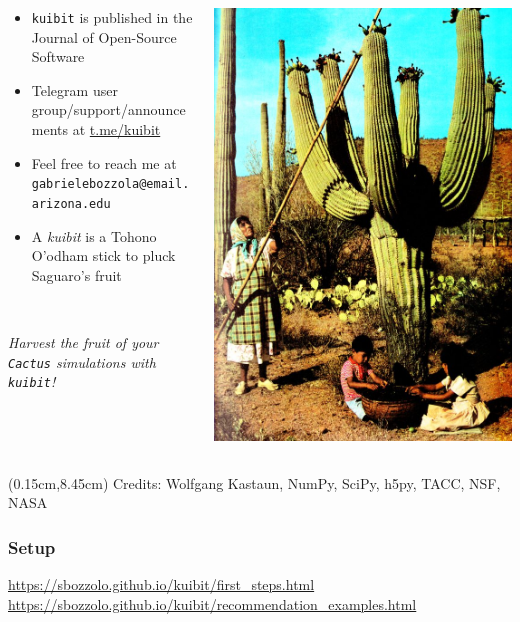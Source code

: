\documentclass[compress, aspectratio=169]{beamer}
\begin{document}
\begin{frame}
  \centering
  \begin{columns}
    \begin{column}{0.6\linewidth}
      \begin{itemize}
        \item \texttt{kuibit} is published in the Journal of Open-Source Software
        \item Telegram user group/support/announcements at \url{t.me/kuibit}
        \item Feel free to reach me at \texttt{gabrielebozzola@email.arizona.edu}
        \item A \emph{kuibit} is a Tohono O'odham stick to pluck Saguaro's fruit
      \end{itemize}
      \hfill \\[0.5cm]
      \begin{center}
      \emph{Harvest the fruit of your \texttt{Cactus} simulations with \texttt{kuibit}!}
    \end{center}
    \end{column}
    \begin{column}{0.4\linewidth}
      \includegraphics[width=0.85\linewidth]{kuibit}
    \end{column}
  \end{columns}
  \begin{textblock*}{11.5cm}(0.15cm,8.45cm) %
    Credits: Wolfgang Kastaun, NumPy, SciPy, h5py, TACC, NSF, NASA
  \end{textblock*}
\end{frame}

\begin{frame}
  \frametitle{Setup}
  \centering
  \url{https://sbozzolo.github.io/kuibit/first_steps.html}
  \url{https://sbozzolo.github.io/kuibit/recommendation_examples.html}
\end{frame}
\end{document}
